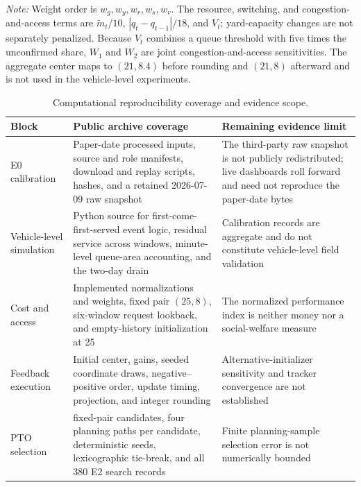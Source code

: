 \documentclass[preprint,12pt,authoryear,a4paper]{elsarticle}
\begin{document}
\begin{table}[htbp]
\begin{tabularx}{\textwidth}{>{\raggedright\arraybackslash}p{2.6cm}>{\raggedright\arraybackslash}p{3.1cm}>{\raggedright\arraybackslash}p{4.2cm}>{\raggedright\arraybackslash}X}
\bottomrule
\end{tabularx}
\begin{minipage}{\textwidth}
\scriptsize\raggedright
\textit{Note:} Weight order is \(w_g,w_y,w_r,w_s,w_v\). The resource, switching, and congestion-and-access terms are \(\widetilde m_t/10\), \(|q_t-q_{t-1}|/18\), and \(V_t\); yard-capacity changes are not separately penalized. Because \(V_t\) combines a queue threshold with five times the unconfirmed share, \(W_1\) and \(W_2\) are joint congestion-and-access sensitivities. The aggregate center maps to \((21,8.4)\) before rounding and \((21,8)\) afterward and is not used in the vehicle-level experiments.
\end{minipage}
\end{table}

\begin{table}[htbp]
\centering
\caption{Computational reproducibility coverage and evidence scope.}
\label{tab:archive-closure}
\footnotesize
\setlength{\tabcolsep}{3pt}
\begin{tabularx}{\textwidth}{>{\raggedright\arraybackslash}p{2.45cm}>{\raggedright\arraybackslash}p{6.15cm}>{\raggedright\arraybackslash}X}
\toprule
Block & Public archive coverage & Remaining evidence limit \\
\midrule
E0 calibration & Paper-date processed inputs, source and role manifests, download and replay scripts, hashes, and a retained 2026-07-09 raw snapshot & The third-party raw snapshot is not publicly redistributed; live dashboards roll forward and need not reproduce the paper-date bytes \\
Vehicle-level simulation & Python source for first-come-first-served event logic, residual service across windows, minute-level queue-area accounting, and the two-day drain & Calibration records are aggregate and do not constitute vehicle-level field validation \\
Cost and access & Implemented normalizations and weights, fixed pair \((25,8)\), six-window request lookback, and empty-history initialization at 25 & The normalized performance index is neither money nor a social-welfare measure \\
Feedback execution & Initial center, gains, seeded coordinate draws, negative--positive order, update timing, projection, and integer rounding & Alternative-initializer sensitivity and tracker convergence are not established \\
PTO selection & 95 fixed-pair candidates, four planning paths per candidate, deterministic seeds, lexicographic tie-break, and all 380 E2 search records & Finite planning-sample selection error is not numerically bounded \\

\end{tabularx}
\end{table}
\end{document}

